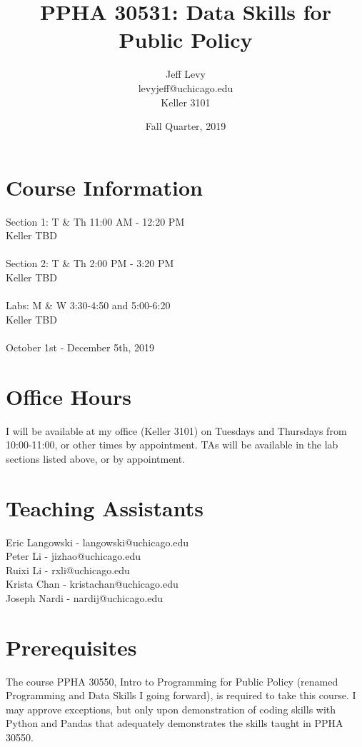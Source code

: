 \documentclass{article}
\author{
Jeff Levy\\
levyjeff@uchicago.edu\\
Keller 3101
}
\title{PPHA 30531: Data Skills for Public Policy}
\date{Fall Quarter, 2019}
\begin{document}
\maketitle

\section*{Course Information}
Section 1: T \& Th 11:00 AM - 12:20 PM \\
Keller TBD \\
 \\
Section 2: T \& Th 2:00 PM - 3:20 PM \\
Keller TBD \\
 \\
Labs: M \& W 3:30-4:50 and 5:00-6:20 \\
Keller TBD \\
 \\
October 1st - December 5th, 2019

\section*{Office Hours}
I will be available at my office (Keller 3101) on Tuesdays and Thursdays from 10:00-11:00, or other times by appointment.  TAs will be available in the lab sections listed above, or by appointment.

\section*{Teaching Assistants}
Eric Langowski - langowski@uchicago.edu\\
Peter Li - jizhao@uchicago.edu\\
Ruixi Li - rxli@uchicago.edu\\
Krista Chan - kristachan@uchicago.edu\\
Joseph Nardi - nardij@uchicago.edu

\section*{Prerequisites}
The course PPHA 30550, Intro to Programming for Public Policy (renamed Programming and Data Skills I going forward), is required to take this course.  I may approve exceptions, but only upon demonstration of coding skills with Python and Pandas that adequately demonstrates the skills taught in PPHA 30550.
\end{document}
